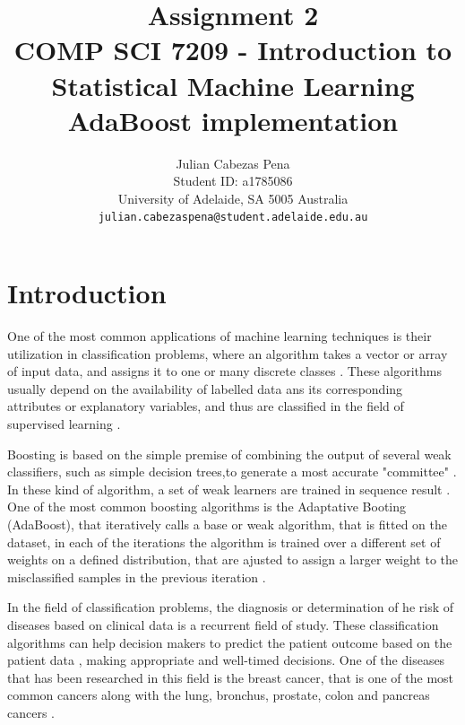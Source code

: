 \documentclass[11pt,twocolumn,letterpaper]{article}
\begin{document}
\title{Assignment 2 \\ COMP SCI 7209 - Introduction to Statistical Machine Learning\\ AdaBoost implementation}

\author{Julian Cabezas Pena\\
Student ID: a1785086\\
University of Adelaide, SA 5005 Australia\\
{\tt\small julian.cabezaspena@student.adelaide.edu.au}
}

\maketitle


\section{Introduction}

One of the most common applications of machine learning techniques is their utilization in classification problems, where an algorithm takes a vector or array of input data, and assigns it to one or many discrete classes \cite{Bishop2006}. These algorithms usually depend on the availability of labelled data ans its corresponding attributes or explanatory variables, and thus are classified in the field of supervised learning \cite{Hastie2009}. 

Boosting is based on the simple premise of combining the output of several weak classifiers, such as simple decision trees,to generate a most accurate "committee" . In these kind of algorithm, a set of weak learners are trained in sequence result \cite{Hastie2009}. One of the most common boosting algorithms is the Adaptative Booting (AdaBoost), that iteratively calls a base or weak algorithm, that is fitted on the dataset, in each of the iterations the algorithm is trained over a different set of weights on a defined distribution, that are ajusted to assign a larger weight to the misclassified samples in the previous iteration \cite{Freund1999}.

In the field of classification problems, the diagnosis or determination of he risk of diseases based on clinical data is a recurrent field of study. These classification algorithms can help decision makers to predict the patient outcome based on the patient data \cite{Bellazzi2008}, making appropriate and well-timed decisions. One of the diseases that has been researched in this field is the breast cancer, that is one of the most common cancers along with the lung, bronchus, prostate, colon and pancreas cancers \cite{afarap2018}. 
\end{document}
